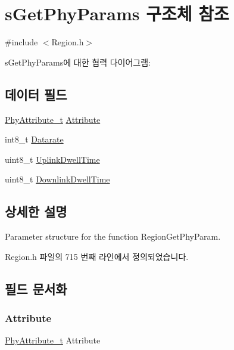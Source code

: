 \hypertarget{structs_get_phy_params}{}\section{s\+Get\+Phy\+Params 구조체 참조}
\label{structs_get_phy_params}


{\ttfamily \#include $<$Region.\+h$>$}



s\+Get\+Phy\+Params에 대한 협력 다이어그램\+:
\subsection*{데이터 필드}
\begin{DoxyCompactItemize}
\item 
\mbox{\hyperlink{group___r_e_g_i_o_n_ga9445b07fdf77581ecfaf389970e635f8}{Phy\+Attribute\+\_\+t}} \mbox{\hyperlink{structs_get_phy_params_abdcb168ffd6913b85e2f635d7a475f2d}{Attribute}}
\item 
int8\+\_\+t \mbox{\hyperlink{structs_get_phy_params_ae2f6080f3aa0e9485c55513ca56bb24d}{Datarate}}
\item 
uint8\+\_\+t \mbox{\hyperlink{structs_get_phy_params_a0e6663762d6f9173bc8d8cb018f8f17a}{Uplink\+Dwell\+Time}}
\item 
uint8\+\_\+t \mbox{\hyperlink{structs_get_phy_params_a63074ce7d23ff98956f5d6f4054f235f}{Downlink\+Dwell\+Time}}
\end{DoxyCompactItemize}


\subsection{상세한 설명}
Parameter structure for the function Region\+Get\+Phy\+Param. 

Region.\+h 파일의 715 번째 라인에서 정의되었습니다.



\subsection{필드 문서화}
\mbox{\label{structs_get_phy_params_abdcb168ffd6913b85e2f635d7a475f2d}} 
\subsubsection{\texorpdfstring{Attribute}{Attribute}}
{\footnotesize\ttfamily \mbox{\hyperlink{group___r_e_g_i_o_n_ga9445b07fdf77581ecfaf389970e635f8}{Phy\+Attribute\+\_\+t}} Attribute}


